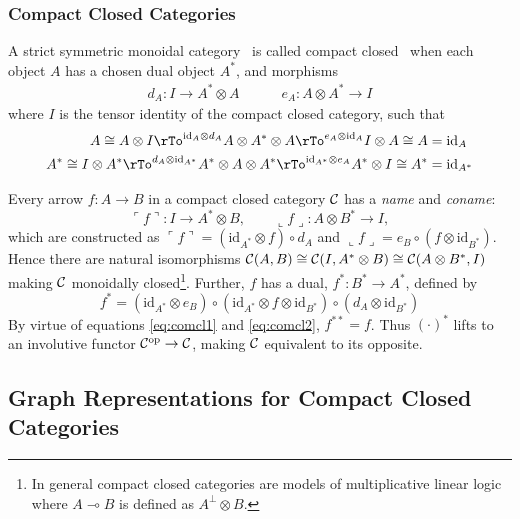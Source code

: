 \documentclass[runningheads]{llncs}
\newcommand{\iso}{\cong}
\newcommand{\name}[1]{%
\ulcorner #1 \urcorner}
\newcommand{\coname}[1]{%
\llcorner #1 \lrcorner}
\newcommand{\catC}{\ensuremath{{\cal C}}\xspace}
\newcommand{\id}[1]{\ensuremath{\mathrm{id}_{#1}}}
\begin{document}
\subsubsection*{Compact Closed Categories}

\begin{definition}
\label{compactcat-def}
A strict symmetric monoidal category~\cite{AspLon:CatTypStruct:1991}
is called compact closed~\cite{KelLap:comcl:1980} when each object $A$
has a chosen dual object $A^*$, and morphisms
\begin{gather*}
  d_A : I \to A^* \otimes A \quad\quad\quad e_A : A \otimes A^* \to I
\end{gather*}
where $I$ is the tensor identity of the compact closed category, such
that
\begin{align}
  A \iso A \otimes I \rTo^{\id{A} \otimes d_A} A \otimes A^* \otimes A
  \rTo^{e_A \otimes \id{A}} I \otimes A \iso A & = \id{A} \label{eq:comcl1}\\
  A^* \iso I \otimes A^* \rTo^{ d_A \otimes \id{A^*}} A^* \otimes A
  \otimes A^* \rTo^{\id{A^*} \otimes e_A} A^* \otimes I \iso A^* & =
  \id{A^*} \label{eq:comcl2}
\end{align}
\end{definition}

Every arrow $f:A\to B$ in a compact closed category \catC
has a \emph{name} and \emph{coname}:
\[
\name{f} : I \to A^* \otimes B, \qquad \coname{f} : A \otimes  B^* \to I,
\]
which are constructed as $\name{f} = (\id{A^*}\otimes f) \circ d_A$ and
$\coname{f} = e_B \circ (f \otimes \id{B^*})$.  Hence there are natural
isomorphisms $\catC(A,B) \iso \catC(I,A^*\otimes B) \iso
\catC(A\otimes B^*,I)$ making \catC monoidally closed\footnote{In
  general compact closed categories  are models of multiplicative
  linear logic where $A \multimap B$ is defined as $A^\bot \otimes B$.}.
Further,  $f$ has a dual, $f^* : B^* \to A^*$, defined by 
\[
f^* = (\id{A^*} \otimes e_B) \circ (\id{A^*}\otimes f \otimes
\id{B^*}) \circ (d_A \otimes \id{B^*})
\]
By virtue of equations \eqref{eq:comcl1} and \eqref{eq:comcl2}, $f^{**} =
f$.  Thus $(\cdot)^*$ lifts to an involutive functor
$\catC^{\text{op}} \to \catC$,  making $\catC$ equivalent to its
opposite.

\subsection{Graph Representations for Compact Closed Categories}
\label{sec:graph-repr-comp}
\end{document}
